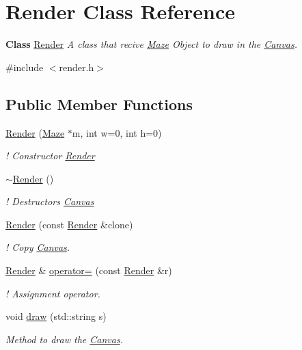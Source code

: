 \hypertarget{classRender}{}\section{Render Class Reference}
\label{classRender}


{\bfseries Class} \hyperlink{classRender}{Render} {\itshape A class that recive \hyperlink{classMaze}{Maze} Object to draw in the \hyperlink{classCanvas}{Canvas}.}  




{\ttfamily \#include $<$render.\+h$>$}

\subsection*{Public Member Functions}
\begin{DoxyCompactItemize}
\item 
\hyperlink{classRender_a6e41bd186a63bf1852209ef34ea3d357}{Render} (\hyperlink{classMaze}{Maze} $\ast$m, int w=0, int h=0)
\begin{DoxyCompactList}\small\item\em ! Constructor \hyperlink{classRender}{Render} \end{DoxyCompactList}\item 
\hyperlink{classRender_ab0f4b917605cb15902f8d045a4197faf}{$\sim$\+Render} ()
\begin{DoxyCompactList}\small\item\em ! Destructors \hyperlink{classCanvas}{Canvas} \end{DoxyCompactList}\item 
\hyperlink{classRender_a034f7ab9a411cf3d6d379c27d4fe8115}{Render} (const \hyperlink{classRender}{Render} \&clone)
\begin{DoxyCompactList}\small\item\em ! Copy \hyperlink{classCanvas}{Canvas}. \end{DoxyCompactList}\item 
\hyperlink{classRender}{Render} \& \hyperlink{classRender_aeb62fc4c9d0a068daa1c848039bf7e6e}{operator=} (const \hyperlink{classRender}{Render} \&r)
\begin{DoxyCompactList}\small\item\em ! Assignment operator. \end{DoxyCompactList}\item 
void \hyperlink{classRender_a67e9fdbd6725960fd59d6350e8cd17cc}{draw} (std\+::string s)
\begin{DoxyCompactList}\small\item\em Method to draw the \hyperlink{classCanvas}{Canvas}. \end{DoxyCompactList}\end{DoxyCompactItemize}


